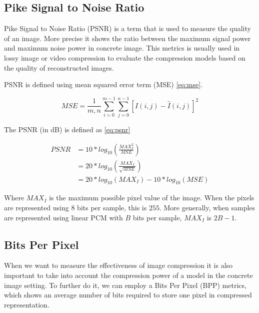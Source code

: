 \subsection{Pike Signal to Noise Ratio}

Pike Signal to Noise Ratio (PSNR) is a term that is used to measure the quality of an image. More precise it shows the ratio between the maximum signal power and maximum noise power in concrete image. This metrics is usually used in lossy image or video compression to evaluate the compression models based on the quality of reconstructed images.

PSNR is defined using mean squared error term (MSE) \ref{eq:mse}.

\begin{equation}
    \label{eq:mse}
    \mathit{MSE} = \frac{1}{m,n} \sum _{i=0}^{m-1} \sum _{j=0}^{n-1} [I(i,j)-\hat{I}(i,j)]^{2}
\end{equation}

The PSNR (in dB) is defined as \ref{eq:psnr}

\begin{equation}
    \label{eq:psnr}
    \begin{aligned}
        \mathit {PSNR} & = 10 * log_{10} \left(\frac{\mathit{{MAX}_{I}^{2}}}{\mathit {MSE}} \right)   \\
                       & = 20 * log_{10} \left(\frac{\mathit{{MAX}_{I}}}{\sqrt{\mathit{MSE}}} \right) \\
                       & = 20 * log_{10}(\mathit{{MAX}_{I}}) - 10 * log_{10}(\mathit{MSE})
    \end{aligned}
\end{equation}

Where $MAX_I$ is the maximum possible pixel value of the image. When the pixels are represented using $8$ bits per sample, this is $255$. More generally, when samples are represented using linear PCM with $B$ bits per sample, $MAX_I$ is $2B − 1$.

\subsection{Bits Per Pixel}

When we want to measure the effectiveness of image compression it is also important to take into account the compression power of a model in the concrete image setting. To further do it, we can employ a Bits Per Pixel (BPP) metrics, which shows an average number of bits required to store one pixel in compressed representation.

